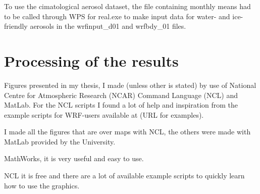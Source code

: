 To use the cimatological aerosol dataset, the file containing monthly means had to be called through WPS for real.exe to make input data for water- and ice-friendly aerosols in the wrfinput\_d01 and wrfbdy\_01 files.

\section{Processing of the results}
Figures presented in my thesis, I made (unless other is stated) by use of National Centre for Atmospheric Research (NCAR) Command Language (NCL) and MatLab. For the NCL scripts I found a lot of help and inspiration from the example scripts for WRF-users available at (URL for examples).

I made all the figures that are over maps with NCL, the others were made with MatLab provided by the University.

MathWorks, it is very useful and easy to use.

NCL it is free and there are a lot of available example scripts to quickly learn how to use the graphics.